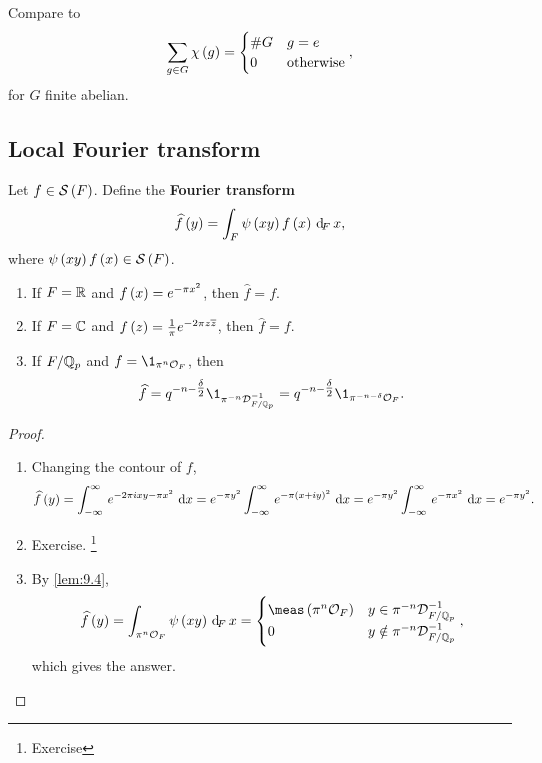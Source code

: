 Compare to
$$ \sum_{g \in G} \chi\br{g} =
\begin{cases}
\#G & g = e \\
0 & \text{otherwise}
\end{cases},
$$
for $ G $ finite abelian.

\pagebreak

\subsection{Local Fourier transform}

\begin{definition*}
Let $ f \in \SSS\br{F} $. Define the \textbf{Fourier transform}
$$ \widehat{f}\br{y} = \intF{\psi\br{xy}f\br{x}}{x}, $$
where $ \psi\br{xy}f\br{x} \in \SSS\br{F} $.
\end{definition*}

\begin{proposition}
\label{prop:9.5}
\hfill
\begin{enumerate}
\item If $ F = \mathbb{R} $ and $ f\br{x} = e^{-\pi x^2} $, then $ \widehat{f} = f $.
\item If $ F = \mathbb{C} $ and $ f\br{z} = \tfrac{1}{\pi}e^{-2\pi z\overline{z}} $, then $ \widehat{f} = f $.
\item If $ F / \mathbb{Q}_p $ and $ f = \1_{\pi^n\OOO_F} $, then
$$ \widehat{f} = q^{-n - \tfrac{\delta}{2}}\1_{\pi^{-n}\DDD_{F / \QQ_p}^{-1}} = q^{-n - \tfrac{\delta}{2}}\1_{\pi^{-n - \delta}\OOO_F}. $$
\end{enumerate}
\end{proposition}

\begin{proof}
\hfill
\begin{enumerate}
\item Changing the contour of $ f $,
$$ \widehat{f}\br{y} = \intd{-\infty}{\infty}{e^{-2\pi ixy - \pi x^2}}{x} = e^{-\pi y^2}\intd{-\infty}{\infty}{e^{-\pi\br{x + iy}^2}}{x} = e^{-\pi y^2}\intd{-\infty}{\infty}{e^{-\pi x^2}}{x} = e^{-\pi y^2}. $$
\item Exercise. \footnote{Exercise}
\item By \ref{lem:9.4},
$$ \widehat{f}\br{y} = \intF[\pi^n\OOO_F]{\psi\br{xy}}{x} =
\begin{cases}
\meas\br{\pi^n\OOO_F} & y \in \pi^{-n}\DDD_{F / \QQ_p}^{-1} \\
0 & y \notin \pi^{-n}\DDD_{F / \QQ_p}^{-1}
\end{cases},
$$
which gives the answer.
\end{enumerate}
\end{proof}


